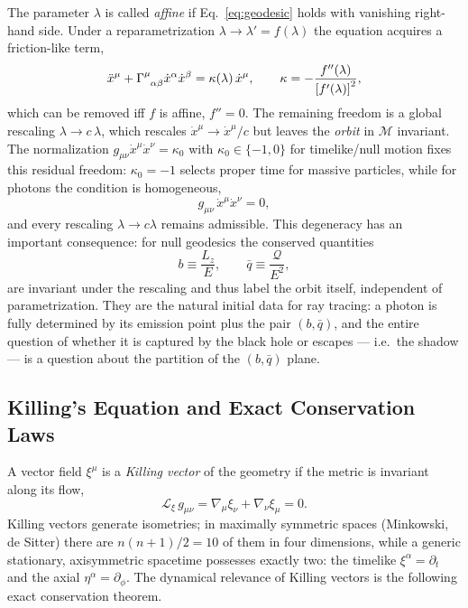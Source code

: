 \documentclass[11pt]{book}
\begin{document}
The parameter $\lambda$ is called \emph{affine} if Eq.~\eqref{eq:geodesic} holds with
vanishing right-hand side. Under a reparametrization $\lambda \to \lambda' =
f(\lambda)$ the equation acquires a friction-like term,
\begin{equation}
    \ddot{x}^\mu + \tensor{\Gamma}{^\mu_{\alpha\beta}}\dot{x}^\alpha\dot{x}^\beta
    = \kappa(\lambda)\, \dot{x}^\mu, \qquad
    \kappa = -\frac{f''(\lambda)}{\left[f'(\lambda)\right]^2},
\end{equation}
which can be removed iff $f$ is affine, $f'' = 0$. The remaining freedom is a global
rescaling $\lambda \to c\,\lambda$, which rescales $\dot{x}^\mu \to \dot{x}^\mu/c$ but
leaves the \emph{orbit} in $\mathcal{M}$ invariant. The normalization
 $g_{\mu\nu}\dot{x}^\mu\dot{x}^\nu = \kappa_0$ with $\kappa_0 \in \{-1, 0\}$ for
timelike/null motion fixes this residual freedom: $\kappa_0 = -1$ selects proper time
for massive particles, while for photons the condition is homogeneous,
\begin{equation}
    g_{\mu\nu}\, \dot{x}^\mu \dot{x}^\nu = 0 ,
\end{equation}
and every rescaling $\lambda \to c\lambda$ remains admissible. This degeneracy has an
important consequence: for null geodesics the conserved quantities
\begin{equation}
    b \equiv \frac{L_z}{E}, \qquad \bar{q} \equiv \frac{\mathcal{Q}}{E^2},
\end{equation}
are invariant under the rescaling and thus label the orbit itself, independent of
parametrization. They are the natural initial data for ray tracing: a photon is fully
determined by its emission point plus the pair $(b, \bar{q})$, and the entire question
of whether it is captured by the black hole or escapes --- i.e.\ the shadow --- is a
question about the partition of the $(b, \bar{q})$ plane.


\subsection{Killing's Equation and Exact Conservation Laws}

A vector field $\xi^\mu$ is a \emph{Killing vector} of the geometry if the metric is
invariant along its flow,
\begin{equation}\label{eq:killing_eq}
    \mathcal{L}_\xi\, g_{\mu\nu} = \nabla_\mu \xi_\nu + \nabla_\nu \xi_\mu = 0 .
\end{equation}
Killing vectors generate isometries; in maximally symmetric spaces (Minkowski, de Sitter)
there are $n(n+1)/2 = 10$ of them in four dimensions, while a generic stationary,
axisymmetric spacetime possesses exactly two: the timelike $\xi^\alpha = \partial_t$ and
the axial $\eta^\alpha = \partial_\phi$. The dynamical relevance of Killing vectors is
the following exact conservation theorem.
\end{document}
